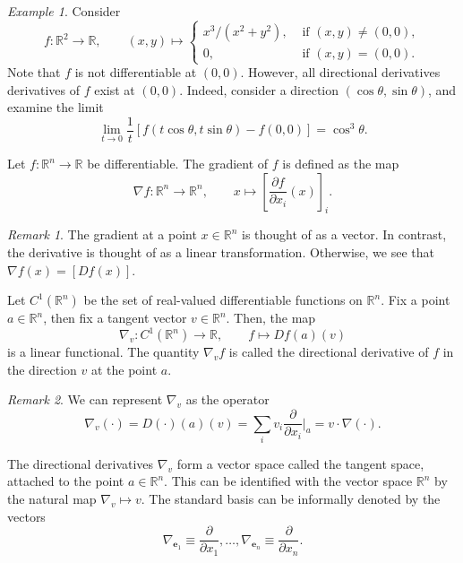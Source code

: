 \documentclass[11pt]{article}
\newcommand{\R}{\mathbb{R}}
\renewcommand{\vec}[1]{\boldsymbol{#1}}
\newcommand{\ve}{\vec{e}}
\newcommand{\pp}[2]{\frac{\partial #1}{\partial #2}}
\newcommand{\grad}{\nabla}
\theoremstyle{definition}
\theoremstyle{remark}
\newtheorem*{remark}{Remark}
\newtheorem*{example}{Example}
\numberwithin{equation}{section}
\begin{document}
    \begin{example}
        Consider \[
            f\colon \R^2 \to \R, \qquad (x, y) \mapsto \begin{cases}
                x^3/(x^2 + y^2), &\text{ if } (x, y) \neq (0, 0), \\
                0, &\text{ if } (x, y) = (0, 0).
            \end{cases}
        \] Note that $f$ is not differentiable at $(0, 0)$. However, all directional
        derivatives derivatives of $f$ exist at $(0, 0)$. Indeed, consider a
        direction $(\cos\theta, \sin\theta)$, and examine the limit \[
            \lim_{t \to 0} \frac{1}{t}\left[f(t\cos\theta, t\sin\theta) - f(0,
            0)\right] = \cos^3\theta.
        \] 
    \end{example}

    \begin{definition}
        Let $f\colon \R^n \to \R$ be differentiable. The gradient of $f$ is defined
        as the map \[
            \grad{f}\colon \R^n \to \R^n, \qquad x \mapsto
            \left[\pp{f}{x_i}(x)\right]_i.
        \] 
        \begin{remark}
            The gradient at a point $x \in \R^n$ is thought of as a vector. In
            contrast, the derivative is thought of as a linear transformation.
            Otherwise, we see that $\grad{f}(x) = [Df(x)]$.
        \end{remark}
    \end{definition}

    \begin{definition}
        Let $C^1(\R^n)$ be the set of real-valued differentiable functions on $\R^n$.
        Fix a point $a \in \R^n$, then fix a tangent vector $v \in \R^n$. Then, the
        map \[
            \grad_v\colon C^1(\R^n) \to \R, \qquad f\mapsto Df(a)(v)
        \] is a linear functional. The quantity $\grad_v f$ is called the
        directional derivative of $f$ in the direction $v$ at the point $a$.
        \begin{remark}
            We can represent $\grad_v$ as the operator \[
                \grad_v (\cdot) = D(\cdot)(a)(v) = \sum_i v_i \pp{}{x_i}\Big|_a =
                v\cdot \grad (\cdot).
            \]
        \end{remark}
    \end{definition}
    
    \begin{lemma}
        The directional derivatives $\grad_v$ form a vector space called the tangent
        space, attached to the point $a \in \R^n$. This can be identified with the
        vector space $\R^n$ by the natural map $\grad_v \mapsto v$. The standard
        basis can be informally denoted by the vectors \[
            \grad_{\ve_1} \equiv \pp{}{x_1}, \dots, \grad_{\ve_n} \equiv \pp{}{x_n}.
        \] 
    \end{lemma}
\end{document}
